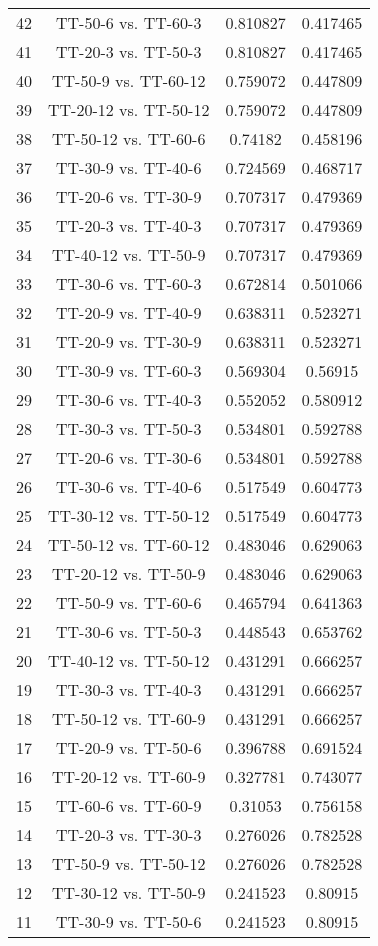 \documentclass[a4paper,10pt]{article}
\begin{document}
\begin{landscape}
\begin{table}[!htp]
\begin{tabular}{cccc}
42&TT-50-6 vs. TT-60-3&0.810827&0.417465\\
41&TT-20-3 vs. TT-50-3&0.810827&0.417465\\
40&TT-50-9 vs. TT-60-12&0.759072&0.447809\\
39&TT-20-12 vs. TT-50-12&0.759072&0.447809\\
38&TT-50-12 vs. TT-60-6&0.74182&0.458196\\
37&TT-30-9 vs. TT-40-6&0.724569&0.468717\\
36&TT-20-6 vs. TT-30-9&0.707317&0.479369\\
35&TT-20-3 vs. TT-40-3&0.707317&0.479369\\
34&TT-40-12 vs. TT-50-9&0.707317&0.479369\\
33&TT-30-6 vs. TT-60-3&0.672814&0.501066\\
32&TT-20-9 vs. TT-40-9&0.638311&0.523271\\
31&TT-20-9 vs. TT-30-9&0.638311&0.523271\\
30&TT-30-9 vs. TT-60-3&0.569304&0.56915\\
29&TT-30-6 vs. TT-40-3&0.552052&0.580912\\
28&TT-30-3 vs. TT-50-3&0.534801&0.592788\\
27&TT-20-6 vs. TT-30-6&0.534801&0.592788\\
26&TT-30-6 vs. TT-40-6&0.517549&0.604773\\
25&TT-30-12 vs. TT-50-12&0.517549&0.604773\\
24&TT-50-12 vs. TT-60-12&0.483046&0.629063\\
23&TT-20-12 vs. TT-50-9&0.483046&0.629063\\
22&TT-50-9 vs. TT-60-6&0.465794&0.641363\\
21&TT-30-6 vs. TT-50-3&0.448543&0.653762\\
20&TT-40-12 vs. TT-50-12&0.431291&0.666257\\
19&TT-30-3 vs. TT-40-3&0.431291&0.666257\\
18&TT-50-12 vs. TT-60-9&0.431291&0.666257\\
17&TT-20-9 vs. TT-50-6&0.396788&0.691524\\
16&TT-20-12 vs. TT-60-9&0.327781&0.743077\\
15&TT-60-6 vs. TT-60-9&0.31053&0.756158\\
14&TT-20-3 vs. TT-30-3&0.276026&0.782528\\
13&TT-50-9 vs. TT-50-12&0.276026&0.782528\\
12&TT-30-12 vs. TT-50-9&0.241523&0.80915\\
11&TT-30-9 vs. TT-50-6&0.241523&0.80915\\

\end{tabular}
\end{table}
\end{landscape}
\end{document}

